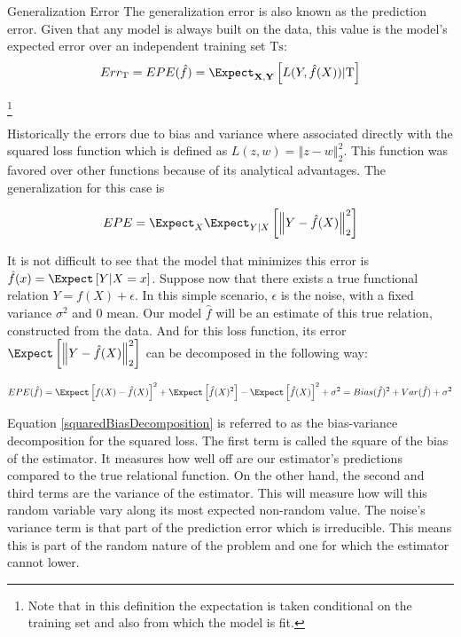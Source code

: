  \begin{definition}{Generalization Error}
 	The generalization error is also known as the prediction error. Given that any model is always built on the data, this value is the model's expected error over an independent training set $\mathrm{Ts}$:
 	$$ Err_{\mathrm{T}} =  EPE(\hat{f})= \Expect_{\textbf{X},\textbf{Y}} \left[ L(Y,\hat{f}(X)) |  \mathrm{T}\right]$$
 \end{definition}\footnote{Note that in this definition the expectation is taken conditional on the training set and also from which the model is fit.}
 
 Historically the errors due to bias and variance where associated directly with the squared loss function which is defined as $L(z,w) = \left\Vert z-w \right\Vert^2_2$. This function was favored over other functions because of its analytical advantages.  The generalization for this case is
 
 \begin{equation}\label{squaredEPE}
 EPE = \Expect_X \Expect_{Y|X} \left[ \left\Vert  Y - \hat{f}(X)  \right\Vert_2^2 \right]
 \end{equation}
 
 It is not difficult to see that the model that minimizes this error is $\hat{f}(x) = \Expect \left[ Y | X=x \right] $. Suppose now that there exists a true functional relation $Y = f(X) + \epsilon$. 
 In this simple scenario, $\epsilon$ is the noise, with a fixed variance $\sigma^2$ and $0$ mean. Our model $\hat{f}$ will be an estimate of this true relation, constructed from the data. And for this loss function, its error $\Expect \left[ \left\Vert Y  - \hat{f}(X) \right\Vert_2^2 \right]$ can be decomposed in the following way:
 
 \begin{equation}\label{squaredBiasDecomposition}
 EPE( \hat{f} ) = \Expect \left[   f(X)  - \hat{f}(X) \right]^2 +  \Expect \left[ \hat{f}(X)^2  \right] - \Expect \left[ \hat{f}(X)  \right]^2  + \sigma^2
 = Bias(\hat{f})^2 + Var(\hat{f}) + \sigma^2
 \end{equation}
 
 Equation \ref{squaredBiasDecomposition} is referred to as the bias-variance decomposition for the squared loss. The first term is called the square of the bias of the estimator. It measures how well off are our estimator's predictions compared to the true relational function. On the other hand, the second and third terms are the variance of the estimator. This will measure how will this random variable vary along its most expected non-random value. The noise's variance term is that part of the prediction error which is irreducible. This means this is part of the random nature of the problem and one for which the estimator cannot lower.
 
